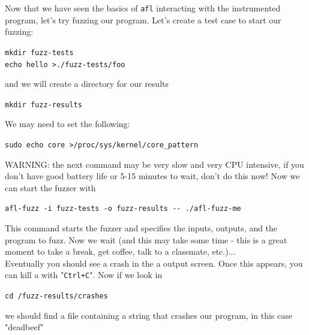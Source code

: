 \documentclass{article}
\begin{document}
\noindent Now that we have seen the basics of \lstinline{afl}
 interacting with the instrumented
program, let's try fuzzing our program. Let's create a test case to start our
fuzzing:
\begin{center}
    \lstinline{mkdir fuzz-tests}\\
    \lstinline{echo hello >./fuzz-tests/foo}
\end{center}
\noindent and we will create a directory for our results
\begin{center}
    \lstinline{mkdir fuzz-results}
\end{center}
\noindent We may need to set the following:
\begin{center}
    \lstinline{sudo echo core >/proc/sys/kernel/core_pattern}
\end{center}
\noindent WARNING: the next command may be very slow and very CPU intensive,
if you don't have good battery life or 5-15 minutes to wait, don't do this now!
Now we can start the fuzzer with
\begin{center}
    \lstinline{afl-fuzz -i fuzz-tests -o fuzz-results -- ./afl-fuzz-me}
\end{center}
\noindent This command starts the fuzzer and specifies the inputs, outputs, and the
program to fuzz.
Now we wait (and this may take some time - this is a great moment to
take a break, get coffee, talk to a classmate, etc.)...\\

\noindent Eventually you should see a crash in the a
 output screen. Once this
appears, you can kill a
 with "\lstinline{Ctrl+C}".
Now if we look in

\begin{center}
    \lstinline{cd /fuzz-results/crashes}
\end{center}
\noindent we should find a file containing a string that crashes our program, in this
case "deadbeef"
% 
% 
\end{document}
